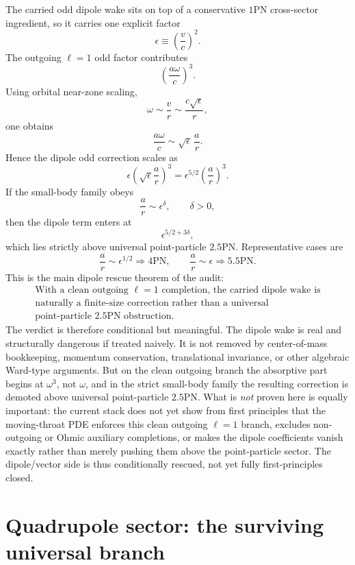 \documentclass[11pt]{article}
\begin{document}
The carried odd dipole wake sits on top of a conservative $1$PN cross-sector
ingredient, so it carries one explicit factor
\[
\epsilon\equiv \left(\frac{v}{c}\right)^2.
\]
The outgoing $\ell=1$ odd factor contributes
\[
\left(\frac{a\omega}{c}\right)^3.
\]
Using orbital near-zone scaling,
\[
\omega\sim \frac{v}{r}\sim \frac{c\sqrt\epsilon}{r},
\]
one obtains
\[
\frac{a\omega}{c}\sim \sqrt\epsilon\,\frac{a}{r}.
\]
Hence the dipole odd correction scales as
\[
\epsilon\left(\sqrt\epsilon\frac{a}{r}\right)^3
=
\epsilon^{5/2}\left(\frac{a}{r}\right)^3.
\]
If the small-body family obeys
\[
\frac{a}{r}\sim \epsilon^\delta,
\qquad
\delta>0,
\]
then the dipole term enters at
\[
\boxed{\epsilon^{5/2+3\delta},}
\]
which lies strictly above universal point-particle $2.5$PN.  Representative
cases are
\[
\frac{a}{r}\sim \epsilon^{1/2}\Rightarrow 4\mathrm{PN},
\qquad
\frac{a}{r}\sim \epsilon\Rightarrow 5.5\mathrm{PN}.
\]
This is the main dipole rescue theorem of the audit:
\[
\boxed{\begin{gathered}
\text{With a clean outgoing }\ell=1\text{ completion, the carried dipole wake is}\\
\text{naturally a finite-size correction rather than a universal}\\
\text{point-particle }2.5\text{PN obstruction.}
\end{gathered}}
\]
The verdict is therefore conditional but meaningful.  The dipole wake is real
and structurally dangerous if treated naively.  It is not removed by
center-of-mass bookkeeping, momentum conservation, translational invariance, or
other algebraic Ward-type arguments.  But on the clean outgoing branch the
absorptive part begins at $\omega^3$, not $\omega$, and in the strict small-body
family the resulting correction is demoted above universal point-particle
$2.5$PN.  What is \emph{not} proven here is equally important: the current stack
does not yet show from first principles that the moving-throat PDE enforces this
clean outgoing $\ell=1$ branch, excludes non-outgoing or Ohmic auxiliary
completions, or makes the dipole coefficients vanish exactly rather than merely
pushing them above the point-particle sector.  The dipole/vector side is thus
conditionally rescued, not yet fully first-principles closed.

\section{Quadrupole sector: the surviving universal branch}
\label{sec:quadrupole-surviving-branch}
\end{document}

